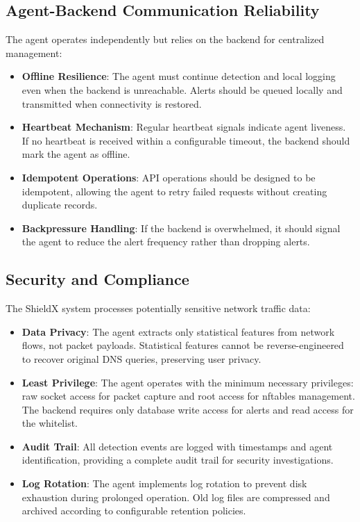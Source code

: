 \documentclass[../Main.tex]{subfiles}
\begin{document}
\subsection{Agent-Backend Communication Reliability}

The agent operates independently but relies on the backend for centralized management:

\begin{itemize}
    \item \textbf{Offline Resilience}: The agent must continue detection and local logging even when the backend is unreachable. Alerts should be queued locally and transmitted when connectivity is restored.
    \item \textbf{Heartbeat Mechanism}: Regular heartbeat signals indicate agent liveness. If no heartbeat is received within a configurable timeout, the backend should mark the agent as offline.
    \item \textbf{Idempotent Operations}: API operations should be designed to be idempotent, allowing the agent to retry failed requests without creating duplicate records.
    \item \textbf{Backpressure Handling}: If the backend is overwhelmed, it should signal the agent to reduce the alert frequency rather than dropping alerts.
\end{itemize}

\subsection{Security and Compliance}

The ShieldX system processes potentially sensitive network traffic data:

\begin{itemize}
    \item \textbf{Data Privacy}: The agent extracts only statistical features from network flows, not packet payloads. Statistical features cannot be reverse-engineered to recover original DNS queries, preserving user privacy.
    \item \textbf{Least Privilege}: The agent operates with the minimum necessary privileges: raw socket access for packet capture and root access for nftables management. The backend requires only database write access for alerts and read access for the whitelist.
    \item \textbf{Audit Trail}: All detection events are logged with timestamps and agent identification, providing a complete audit trail for security investigations.
    \item \textbf{Log Rotation}: The agent implements log rotation to prevent disk exhaustion during prolonged operation. Old log files are compressed and archived according to configurable retention policies.
\end{itemize}
\end{document}
